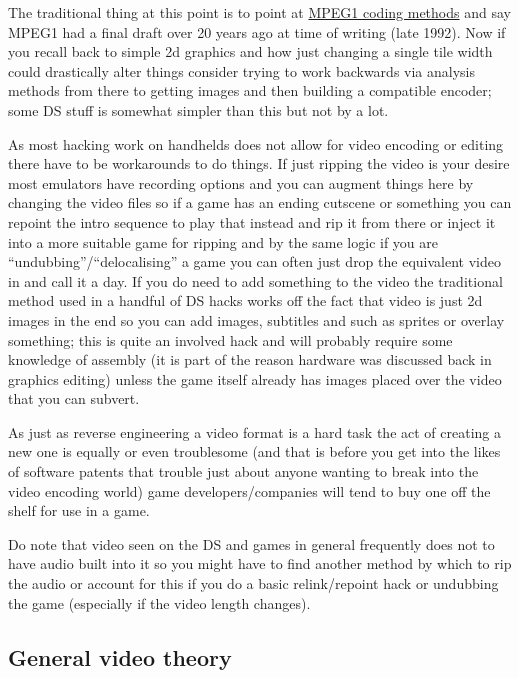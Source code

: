 \documentclass[
]{book}
\begin{document}
The traditional thing at this point is to point at \href{http://www.cmlab.csie.ntu.edu.tw/cml/dsp/training/coding/mpeg1/}{MPEG1 coding methods} and say MPEG1 had a final draft over 20 years ago at time of writing (late 1992). Now if you recall back to simple 2d graphics and how just changing a single tile width could drastically alter things consider trying to work backwards via analysis methods from there to getting images and then building a compatible encoder; some DS stuff is somewhat simpler than this but not by a lot.

As most hacking work on handhelds does not allow for video encoding or editing there have to be workarounds to do things. If just ripping the video is your desire most emulators have recording options and you can augment things here by changing the video files so if a game has an ending cutscene or something you can repoint the intro sequence to play that instead and rip it from there or inject it into a more suitable game for ripping and by the same logic if you are ``undubbing''/``delocalising'' a game you can often just drop the equivalent video in and call it a day. If you do need to add something to the video the traditional method used in a handful of DS hacks works off the fact that video is just 2d images in the end so you can add images, subtitles and such as sprites or overlay something; this is quite an involved hack and will probably require some knowledge of assembly (it is part of the reason hardware was discussed back in graphics editing) unless the game itself already has images placed over the video that you can subvert.

As just as reverse engineering a video format is a hard task the act of creating a new one is equally or even troublesome (and that is before you get into the likes of software patents that trouble just about anyone wanting to break into the video encoding world) game developers/companies will tend to buy one off the shelf for use in a game.

Do note that video seen on the DS and games in general frequently does not to have audio built into it so you might have to find another method by which to rip the audio or account for this if you do a basic relink/repoint hack or undubbing the game (especially if the video length changes).

\hypertarget{general-video-theory}{%
\subsection{General video theory}\label{general-video-theory}}
\end{document}
